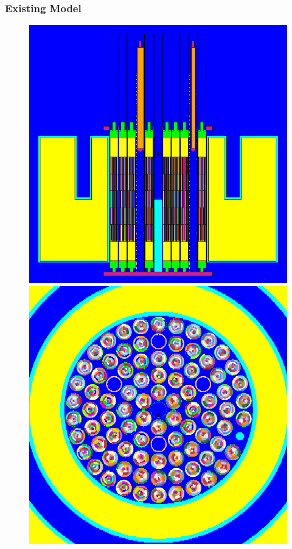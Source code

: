 \documentclass[fleqn]{beamer}
\begin{document}
\begin{frame}
\frametitle{Existing Model}

\begin{figure}
\centering
\includegraphics[width = .5\textwidth]{existingyz}
\includegraphics[width = .5\textwidth]{existingxy}
\caption{}
\end{figure}

\end{frame}
\end{document}
